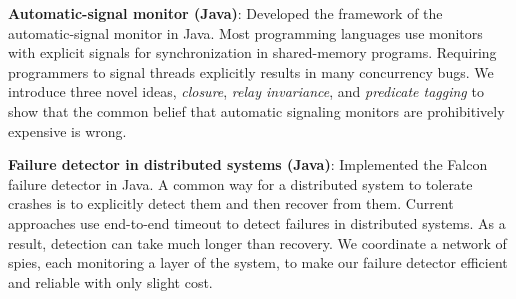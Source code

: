 \begin{myexp}
\begin{myexp}
    \item {\bf Automatic-signal monitor (Java)}: 
        Developed the framework of the automatic-signal monitor in Java. Most
        programming languages use monitors with explicit signals for
        synchronization in shared-memory programs. Requiring programmers to
        signal threads explicitly results in many concurrency bugs. We
        introduce three novel ideas, {\it closure}, {\it relay invariance}, and
        {\it predicate tagging} to show that the common belief that automatic 
        signaling monitors are prohibitively expensive is wrong. 
    \item {\bf Failure detector in distributed systems (Java)}:
        Implemented the Falcon failure detector in Java.
        A common way for a distributed system to tolerate crashes is to
        explicitly detect them and then recover from them. Current approaches 
        use end-to-end timeout to detect failures in distributed systems. As a
        result, detection can take much longer than recovery. We coordinate a 
        network of spies, each monitoring a layer of the system, to make our
        failure detector efficient and reliable with only slight cost. 

\end{myexp}
\end{myexp}
